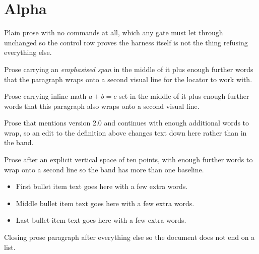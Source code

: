 \documentclass[12pt]{article}
\begin{document}
\section{Alpha}

Plain prose with no commands at all, which any gate must let through unchanged so the
control row proves the harness itself is not the thing refusing everything else.

Prose carrying an \emph{emphasised span} in the middle of it plus enough further words
that the paragraph wraps onto a second visual line for the locator to work with.

Prose carrying inline math $a + b = c$ set in the middle of it plus enough further words
that this paragraph also wraps onto a second visual line.

\gdef\vernum{2.0}
Prose that mentions version \vernum{} and continues with enough additional words to wrap,
so an edit to the definition above changes text down here rather than in the band.

\vspace{10pt}
Prose after an explicit vertical space of ten points, with enough further words to wrap
onto a second line so the band has more than one baseline.

\begin{itemize}
\item First bullet item text goes here with a few extra words.
\item Middle bullet item text goes here with a few extra words.
\item Last bullet item text goes here with a few extra words.
\end{itemize}

Closing prose paragraph after everything else so the document does not end on a list.
\end{document}
